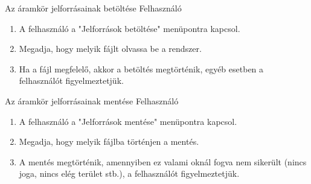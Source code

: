 {Az áramkör jelforrásainak betöltése}
{Felhasználó}
{\vspace{-20pt}\begin{enumerate}
\setlength{\itemsep}{0cm}%
\setlength{\parskip}{0cm}%
\item A felhasználó a "Jelforrások betöltése" menüpontra kapcsol.
\item Megadja, hogy melyik fájlt olvassa be a rendszer.
\item Ha a fájl megfelelő, akkor a betöltés megtörténik, egyéb esetben a felhasználót figyelmeztetjük.
\end{enumerate}\vspace{-20pt}}

{Az áramkör jelforrásainak mentése}
{Felhasználó}
{\vspace{-20pt}\begin{enumerate}
\setlength{\itemsep}{0cm}%
\setlength{\parskip}{0cm}%
\item A felhasználó a "Jelforrások mentése" menüpontra kapcsol.
\item Megadja, hogy melyik fájlba történjen a mentés.
\item A mentés megtörténik, amennyiben ez valami oknál fogva nem sikerült (nincs joga, nincs elég terület stb.), a felhasználót figyelmeztetjük.
\end{enumerate}\vspace{-20pt}}

